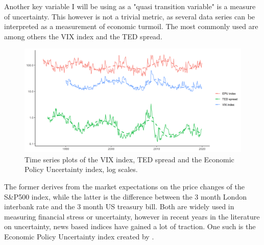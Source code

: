 \documentclass[12pt,a4paper]{article}
\begin{document}
Another key variable I will be using as a "quasi transition variable" is a measure of uncertainty. This however is not a trivial metric, as several data series can be interpreted as a measurement of economic turmoil. The most commonly used are among others the VIX index and the TED spread. 
\begin{center}
	\begin{figure}[h!]
		\includegraphics[width=0.9\linewidth]{plotcompare.png}
		\caption{Time series plots of the VIX index, TED spread and the Economic Policy Uncertainty index, log scales.}
	\end{figure}
\end{center}
The former derives from the market expectations on the price changes of the S\&P500 index, while the latter is the difference between the 3 month London interbank rate and the 3 month US treasury bill. Both are widely used in measuring financial stress or uncertainty, however in recent years in the literature on uncertainty, news based indices have gained a lot of traction. One such is the Economic Policy Uncertainty index created by \textcolor{blue}{\cite{baker2016measuring}}. 
\end{document}
